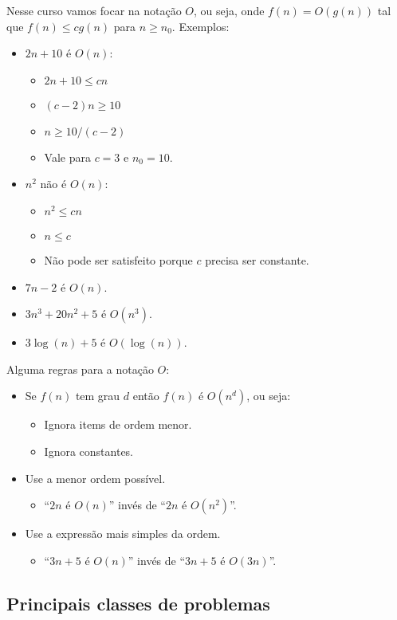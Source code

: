 Nesse curso vamos focar na notação $O$, ou seja, onde $f(n) = O(g(n))$ tal que
$f(n) \leq cg(n)$ para $n \geq n_0$.
Exemplos:
\begin{itemize}
\item $2n + 10$ é $O(n)$:
	\begin{itemize}
	\item $2n + 10 \leq cn$
	\item $(c - 2)n \geq 10$
	\item $n \geq 10/(c - 2)$
	\item Vale para $c = 3$ e $n_0 = 10$.
	\end{itemize}
\item $n^2$ não é $O(n)$:
	\begin{itemize}
	\item $n^2 \leq cn$
	\item $n \leq c$
	\item Não pode ser satisfeito porque $c$ precisa ser constante.
	\end{itemize}
\item $7n - 2$ é $O(n)$.
\item $3n^3 + 20n^2 + 5$ é $O(n^3)$.
\item $3 \log (n) + 5$ é $O(\log (n))$.
\end{itemize}

Alguma regras para a notação $O$:
\begin{itemize}
\item Se $f(n)$ tem grau $d$ então $f(n)$ é $O(n^d)$, ou seja:
	\begin{itemize}
	\item Ignora items de ordem menor.
	\item Ignora constantes.
	\end{itemize}
\item Use a menor ordem possível.
	\begin{itemize}
	\item ``$2n$ é $O(n)$'' invés de ``$2n$ é $O(n^2)$''.
	\end{itemize}
\item Use a expressão mais simples da ordem.
	\begin{itemize}
	\item ``$3n + 5$ é $O(n)$'' invés de ``$3n+5$ é $O(3n)$''.
	\end{itemize}
\end{itemize}

\subsection{Principais classes de problemas}

